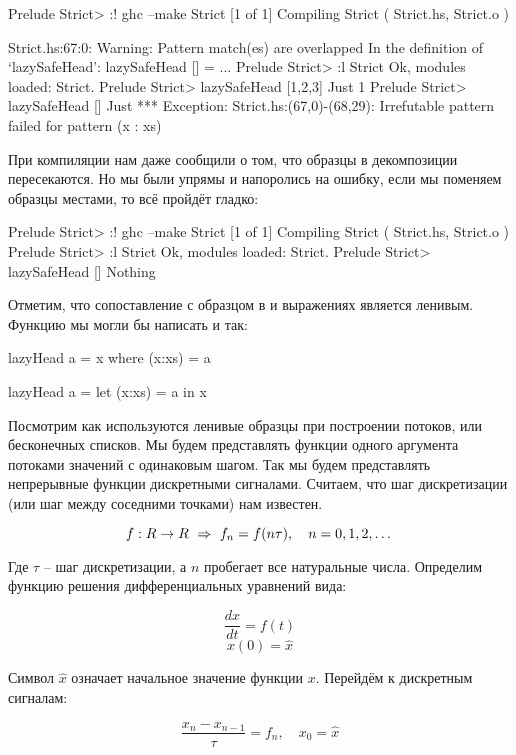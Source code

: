 \begin{code}
Prelude Strict> :! ghc --make Strict
[1 of 1] Compiling Strict           ( Strict.hs, Strict.o )

Strict.hs:67:0:
    Warning: Pattern match(es) are overlapped
             In the definition of `lazySafeHead': lazySafeHead [] = ...
Prelude Strict> :l Strict
Ok, modules loaded: Strict.
Prelude Strict> lazySafeHead [1,2,3]
Just 1
Prelude Strict> lazySafeHead []
Just *** Exception: Strict.hs:(67,0)-(68,29): Irrefutable 
pattern failed for pattern (x : xs)
\end{code}

При компиляции нам даже сообщили о том, что образцы в декомпозиции
пересекаются. Но мы были упрямы и напоролись на ошибку, если мы поменяем
образцы местами, то всё пройдёт гладко:

\begin{code}
Prelude Strict> :! ghc --make Strict
[1 of 1] Compiling Strict           ( Strict.hs, Strict.o )
Prelude Strict> :l Strict
Ok, modules loaded: Strict.
Prelude Strict> lazySafeHead []
Nothing
\end{code}

Отметим, что сопоставление с образцом в  и  
выражениях является ленивым. Функцию  
мы могли бы написать и так:

\begin{code}
lazyHead a = x
    where (x:xs) = a

lazyHead a = 
    let (x:xs) = a
    in  x
\end{code}

Посмотрим как используются ленивые образцы при построении
потоков, или бесконечных списков.
Мы будем представлять функции одного аргумента потоками
значений с одинаковым шагом. Так мы будем представлять 
непрерывные функции дискретными сигналами. Считаем, что
шаг дискретизации (или шаг между соседними точками) нам известен.

\[  f : R \rightarrow R \ \Rightarrow \ f_n = f(n \tau),\quad n = 0,1,2,\dots \]

Где $\tau$ -- шаг дискретизации, а $n$ пробегает все
натуральные числа.
Определим функцию решения дифференциальных уравнений вида:

\[ \frac{dx}{dt} = f(t)  \]
\[ x(0) = \hat{x} \]

Символ $\hat{x}$ означает начальное значение функции $x$.
Перейдём к дискретным сигналам:

\[ \frac{x_n - x_{n-1}}{\tau} = f_n, \quad x_0 = \hat{x} \]

